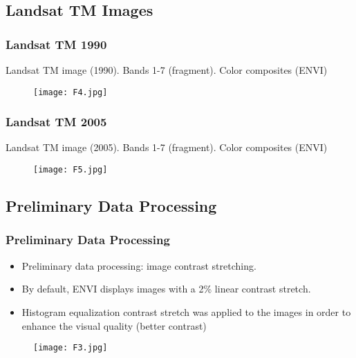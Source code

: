 \documentclass[pdflatex,compress,8pt,
	xcolor={dvipsnames,dvipsnames,svgnames,x11names,table},
	hyperref={colorlinks = true,breaklinks = true, urlcolor = NavyBlue, breaklinks = true}]{beamer}
\begin{document}
\subsection{Landsat TM Images}
\begin{frame}\frametitle{Landsat TM 1990}
Landsat TM image (1990). Bands 1-7 (fragment). Color composites (ENVI)
\begin{figure}[H]
	\centering
		\texttt{[image: F4.jpg]}
\end{figure}
\end{frame}

\begin{frame}\frametitle{Landsat TM 2005}
Landsat TM image (2005). Bands 1-7 (fragment). Color composites (ENVI)
\begin{figure}[H]
	\centering
		\texttt{[image: F5.jpg]}
\end{figure}
\end{frame}

\subsection{Preliminary Data Processing}
\begin{frame}\frametitle{Preliminary Data Processing}
\begin{itemize}
	\item Preliminary data processing: image contrast stretching. 
	\item By default, ENVI displays images with a 2\% linear contrast stretch.
	\item Histogram equalization contrast stretch was applied to the images in order to enhance the visual quality (better contrast)
\end{itemize}
\begin{figure}[H]
	\centering
		\texttt{[image: F3.jpg]}
\end{figure}
\end{frame}
\end{document}
